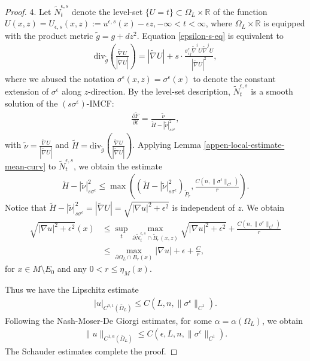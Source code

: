 \documentclass[11pt, letterpaper]{amsart}
\theoremstyle{definition}
\theoremstyle{remark}
\begin{document}
\begin{appendix}
\begin{proof}
4. Let $\tilde{N}_t ^{\epsilon ,s}$ denote the level-set $\{U = t\} \subset \Omega _{L} \times \mathbb{R} $ of the function $U(x,z)=U_{\epsilon ,s}(x, z) := u^{\epsilon ,s}(x) - \epsilon z, -\infty< t < \infty$, where $\Omega _{L} \times \mathbb{R}$ is equipped with the product metric $\tilde{g}= g + d z^2$. Equation \ref{epsilon-s-eq} is equivalent to
\begin{align*}
	\mathrm{div}_{\tilde{g}}\left( \frac{\tilde{\nabla } U}{|\tilde{\nabla } U|} \right)  = |\tilde{\nabla }U| + s\cdot  \frac{\sigma _{ij} ^{\epsilon }\tilde{\nabla}^i U \tilde{\nabla} ^j U}{|\tilde{\nabla} U|^2 },
\end{align*}
where we abused the notation $\sigma ^{\epsilon } (x,z) = \sigma ^{\epsilon } (x)$ to denote the constant extension of $\sigma ^{\epsilon } $ along $z$-direction. By the level-set description, $\tilde{N}_t ^{\epsilon ,s}$ is a smooth solution of the $(s \sigma^{\epsilon }) $-IMCF:
\begin{align*}
	\frac{\partial \tilde{F}}{\partial t} = \frac{\tilde{\nu }}{\tilde{H}- |\tilde{\nu }|^2_{s \sigma ^{\epsilon } }},
\end{align*} 
with $\tilde{\nu } = \frac{\tilde{\nabla }U}{|\tilde{\nabla }U|}$ and $\tilde{H} = \mathrm{div}_{\tilde{g}}\left( \frac{\tilde{\nabla } U}{|\tilde{\nabla } U|} \right) $.  
Applying Lemma \ref{appen-local-estimate-mean-curv} to $\tilde{N}^{\epsilon ,s}_t$, we obtain the estimate
\begin{align*}
	 \tilde{H} - |\tilde{\nu }|^2_{s\sigma ^{\epsilon } } \leq \max \left( (\tilde{H}-|\tilde{\nu }|^2_{s\sigma ^{\epsilon } })_{\tilde{P}_r}, \frac{C(n, \|\sigma ^{\epsilon } \|_{C^1})}{r} \right) .
\end{align*}
Notice that $\tilde{H} - |\tilde{\nu }|^2_{s\sigma ^{\epsilon } } = |\tilde{\nabla }U| = \sqrt{|\nabla u |^2+ \epsilon ^2}  $ is independent of $z$. We obtain
\begin{align*}
	\sqrt{|\nabla u |^2+ \epsilon ^2}(x) &\leq \sup_{t} \max_{\partial \tilde{N}^{\epsilon ,s}_{t} \cap \tilde{B}_r(x,z)} \sqrt{|\nabla u |^2+ \epsilon ^2} + \frac{C(n, \|\sigma ^{\epsilon } \|_{C^1})}{r} \\
	&\leq \max_{\partial \Omega _{L} \cap B_r(x)} |\nabla u| + \epsilon + \frac{C}{r},
\end{align*} 
for $x \in M \setminus E_0$ and any $0<r \leq \eta _M(x)$. 

Thus we have the Lipschitz estimate
\begin{align*}
	|u|_{C^{0,1}(\bar{\Omega }_{L})} \leq C(L, n, \|\sigma ^{\epsilon } \|_{C^1}).
\end{align*} 
Following the Nash-Moser-De Giorgi estimates, for some $\alpha =\alpha (\Omega _{L})$, we obtain
\begin{align*}
	\|u\|_{C^{1, \alpha }(\bar{\Omega }_{L})} \leq C(\epsilon ,L,n, \|\sigma ^{\epsilon } \|_{C^1}).
\end{align*} 
The Schauder estimates complete the proof.


\end{proof}
\end{appendix}
\end{document}
